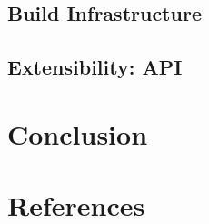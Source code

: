\documentclass[a4paper]{article}
\begin{document}
\subsection{Build Infrastructure}
\subsection{Extensibility: API}

\section{Conclusion}



\newpage



\section{References}



\newpage
~%



\end{document}
